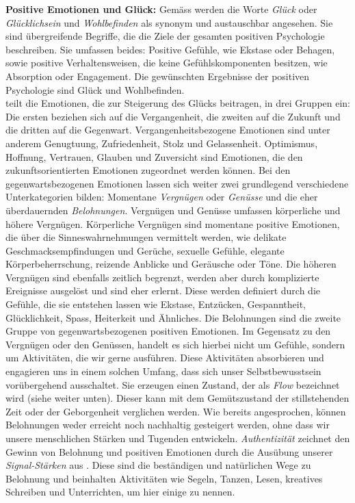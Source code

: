 \par
\textbf{Positive Emotionen und Glück:} 
Gemäss  werden die Worte \textit{Glück} oder \textit{Glücklichsein} und \textit{Wohlbefinden} als synonym und austauschbar angesehen. Sie sind übergreifende Begriffe, die die Ziele der gesamten positiven Psychologie beschreiben. Sie umfassen beides: Positive Gefühle, wie Ekstase oder Behagen, sowie positive Verhaltensweisen, die keine Gefühlskomponenten besitzen, wie Absorption oder Engagement. Die gewünschten Ergebnisse der positiven Psychologie sind Glück und Wohlbefinden.\\
 teilt die Emotionen, die zur Steigerung des Glücks beitragen, in drei Gruppen ein: Die ersten beziehen sich auf die Vergangenheit, die zweiten auf die Zukunft und die dritten auf die Gegenwart. Vergangenheitsbezogene Emotionen sind unter anderem Genugtuung, Zufriedenheit, Stolz und Gelassenheit. Optimismus, Hoffnung, Vertrauen, Glauben und Zuversicht sind Emotionen, die den zukunftsorientierten Emotionen zugeordnet werden können. Bei den gegenwartsbezogenen Emotionen lassen sich weiter zwei grundlegend verschiedene Unterkategorien bilden: Momentane \textit{Vergnügen} oder \textit{Genüsse} und die eher überdauernden \textit{Belohnungen}. Vergnügen und Genüsse umfassen körperliche und höhere Vergnügen. Körperliche Vergnügen sind momentane positive Emotionen, die über die Sinneswahrnehmungen vermittelt werden, wie delikate Geschmacksempfindungen und Gerüche, sexuelle Gefühle, elegante Körperbeherrschung, reizende Anblicke und Geräusche oder Töne. Die höheren Vergnügen sind ebenfalls zeitlich begrenzt, werden aber durch komplizierte Ereignisse ausgelöst und sind eher erlernt. Diese werden definiert durch die Gefühle, die sie entstehen lassen wie Ekstase, Entzücken, Gespanntheit, Glücklichkeit, Spass, Heiterkeit und Ähnliches. Die Belohnungen sind die zweite Gruppe von gegenwartsbezogenen positiven Emotionen. Im Gegensatz zu den Vergnügen oder den Genüssen, handelt es sich hierbei nicht um Gefühle, sondern um Aktivitäten, die wir gerne ausführen. Diese Aktivitäten absorbieren und engagieren uns in einem solchen Umfang, dass sich unser Selbstbewusstsein vorübergehend ausschaltet. Sie erzeugen einen Zustand, der als \textit{Flow} bezeichnet wird (siehe weiter unten). Dieser kann mit dem Gemütszustand der stillstehenden Zeit oder der Geborgenheit verglichen werden. Wie bereits angesprochen, können Belohnungen weder erreicht noch nachhaltig gesteigert werden, ohne dass wir unsere menschlichen Stärken und Tugenden entwickeln. \textit{Authentizität} zeichnet den Gewinn von Belohnung und positiven Emotionen durch die Ausübung unserer \textit{Signal-Stärken} aus \cite{Seligman2003}. Diese sind die beständigen und natürlichen Wege zu Belohnung und beinhalten Aktivitäten wie Segeln, Tanzen, Lesen, kreatives Schreiben und Unterrichten, um hier einige zu nennen.
